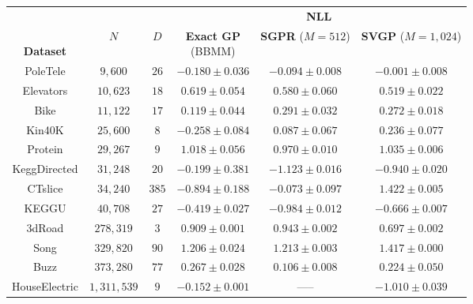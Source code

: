\begin{tabular}{ cccccc }
  \toprule
  &&&
	\multicolumn{3}{c}{{\bf NLL}}  \\
  \cmidrule{4-6}
  \thead{\\{\bf Dataset}} & \thead{\\$N$} & \thead{\\$D$} &
  \thead{{\bf Exact GP} \\ (BBMM)} & \thead{{\bf SGPR} \\ ($M\!=\!512$)} & \thead{{\bf SVGP} \\ ($M\!=\!1,\!024$)}
  \\
  \midrule
	PoleTele             & $9,\!600$          & $26$  &    $\mathbf{-0.180}\pm 0.036$ &   $-0.094\pm 0.008$            &    $-0.001\pm 0.008$           \\
	Elevators            & $10,\!623$         & $18$  &    $0.619\pm 0.054$           &   $0.580\pm 0.060$             &     $\mathbf{0.519}\pm 0.022$  \\
	Bike                 & $11,\!122$         & $17$  &    $\mathbf{0.119}\pm 0.044$  &   $0.291\pm 0.032$             &     $0.272\pm 0.018$           \\
	Kin40K               & $25,\!600$         & $8$   &    $\mathbf{-0.258}\pm 0.084$ &   $0.087\pm 0.067$             &     $0.236\pm 0.077$           \\
	Protein              & $29,\!267$         & $9$   &    $1.018\pm 0.056$           &   $\mathbf{0.970}\pm 0.010$    &     $1.035\pm 0.006$           \\
	KeggDirected         & $31,\!248$         & $20$  &    $-0.199\pm 0.381$          &   $\mathbf{-1.123}\pm 0.016$   &    $-0.940\pm 0.020$           \\
	CTslice              & $34,\!240$         & $385$ &    $\mathbf{-0.894}\pm 0.188$ &   $-0.073\pm 0.097$            &     $1.422\pm 0.005$           \\
	KEGGU                & $40,\!708$         & $27$  &    $-0.419\pm 0.027$          &   $\mathbf{-0.984}\pm 0.012$   &    $-0.666\pm 0.007$           \\
	3dRoad               & $278,\!319$        & $3$   &    $0.909\pm 0.001$           &   $0.943\pm 0.002$             &     $\mathbf{0.697}\pm 0.002$  \\
	Song                 & $329,\!820$        & $90$  &    $\mathbf{1.206}\pm 0.024$  &   $1.213\pm 0.003$             &     $1.417\pm 0.000$           \\
	Buzz                 & $373,\!280$        & $77$  &    $0.267\pm 0.028$           &   $\mathbf{0.106}\pm 0.008$    &     $0.224\pm 0.050$           \\
	HouseElectric        & $1,\!311,\!539$    & $9$   &    $\mathbf{-0.152}\pm 0.001$ &   -----                        &    $-1.010\pm 0.039$           \\
  \bottomrule
\end{tabular}
